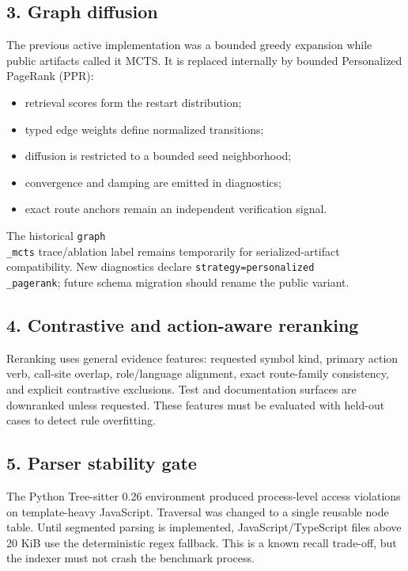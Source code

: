 \documentclass[UTF8,12pt,openany]{ctexbook}
\begin{document}
\subsection{3. Graph diffusion}

The previous active implementation was a bounded greedy expansion while public artifacts called it MCTS. It is replaced internally by bounded Personalized PageRank (PPR):\par

\begin{itemize}
\item retrieval scores form the restart distribution;
\item typed edge weights define normalized transitions;
\item diffusion is restricted to a bounded seed neighborhood;
\item convergence and damping are emitted in diagnostics;
\item exact route anchors remain an independent verification signal.
\end{itemize}

The historical \texttt{graph\\_mcts} trace/ablation label remains temporarily for serialized-artifact compatibility. New diagnostics declare \texttt{strategy=personalized\\_pagerank}; future schema migration should rename the public variant.\par

\subsection{4. Contrastive and action-aware reranking}

Reranking uses general evidence features: requested symbol kind, primary action verb, call-site overlap, role/language alignment, exact route-family consistency, and explicit contrastive exclusions. Test and documentation surfaces are downranked unless requested. These features must be evaluated with held-out cases to detect rule overfitting.\par

\subsection{5. Parser stability gate}

The Python Tree-sitter 0.26 environment produced process-level access violations on template-heavy JavaScript. Traversal was changed to a single reusable node table. Until segmented parsing is implemented, JavaScript/TypeScript files above 20 KiB use the deterministic regex fallback. This is a known recall trade-off, but the indexer must not crash the benchmark process.\par
\end{document}
